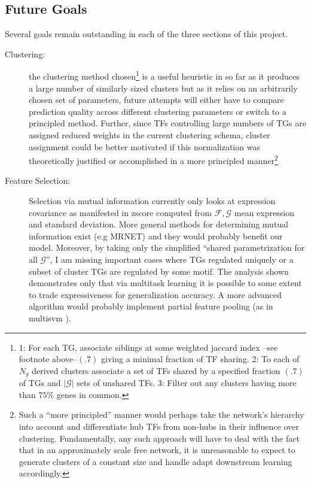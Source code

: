 \documentclass[12pt,a4paper]{article}
\begin{document}
\begin{multicols}{2}
\section{Future Goals}
Several goals remain outstanding in each of the three sections of this project.
\begin{description}
\item[Clustering:]{the clustering method chosen\footnote{1: For each TG, associate siblings at some weighted jaccard index --see footnote above--$(.7)$ giving a minimal fraction of TF sharing. 2: To each of $N_g$ derived clusters associate a set of TFs shared by a specified fraction $(.7)$ of TGs and $|\mathcal{G}|$ sets of unshared TFs. 3: Filter out any clusters having more than $75\%$ genes in common.} is a useful heuristic in so far as it produces a large number of similarly sized clusters but as it relies on an arbitrarily chosen set of parameters, future attempts will either have to compare prediction quality across different clustering parameters or switch to a principled method. Further, since TFs controlling large numbers of TGs are assigned reduced weights in the current clustering schema, cluster assignment could be better motivated if this normalization was theoretically justified or accomplished in a more principled manner\footnote{Such a ``more principled'' manner would perhaps take the network's hierarchy into account and differentiate hub TFs from non-hubs in their influence over clustering. Fundamentally, any such approach will have to deal with the fact that in an approximately scale free network, it is unreasonable to expect to generate clusters of a constant size and handle adapt downstream learning accordingly.}}
\item[Feature Selection:]{Selection via mutual information currently only looks at expression covariance as manifested in zscore computed from $\mathcal{F},\mathcal{G}$ mean expression and standard deviation. More general methods for determining mutual information exist (e.g MRNET\cite{RefWorks:29}) and they would probably benefit our model. Moreover, by taking only the simplified ``shared parametrization for all $\mathcal{G}$'', I am missing important cases where TGs regulated uniquely or a subset of cluster TGs are regulated by some motif. The analysis shown demonstrates only that via multitask learning it is possible to some extent to trade expressiveness for generalization accuracy. A more advanced algorithm would probably implement partial feature pooling (as in multisvm \cite{RefWorks:28}).}

\end{description}
\end{multicols}
\end{document}
